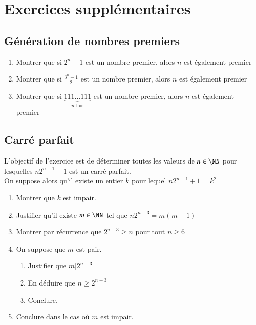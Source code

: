 \documentclass[oneside,12pt]{article}          %
\begin{document}
\section{Exercices supplémentaires}

\subsection{Génération de nombres premiers}

\begin{enumerate}
    \item Montrer que si $2^n-1$ est un nombre premier, alors $n$ est également premier
    \item Montrer que si $\frac{3^n-1}{2}$ est un nombre premier, alors $n$ est également premier
    \item Montrer que si $\underbrace{111\ldots111}_{n \text{ fois}}$ est un nombre premier, alors $n$ est également premier
\end{enumerate}



\subsection{Carré parfait}
L'objectif de l'exercice est de déterminer toutes les valeurs de $n\in\NN$ pour lesquelles $n2^{n-1}+1$ est un carré parfait.\\
On suppose alors qu'il existe un entier $k$ pour lequel $n2^{n-1}+1=k^2$
\begin{enumerate}
	\item Montrer que $k$ est impair.
	\item Justifier qu'il existe $m\in\NN$ tel que $n2^{n-3}=m(m+1)$
	\item Montrer par récurrence que $2^{n-3}\geq n$ pour tout $n\geq6$
	\item On suppose que $m$ est pair.
	\begin{enumerate}
		\item Justifier que $m\vert2^{n-3}$
		\item En déduire que $n\geq2^{n-3}$
		\item Conclure.
	\end{enumerate}
	\item Conclure dans le cas où $m$ est impair.
\end{enumerate}
\end{document}
